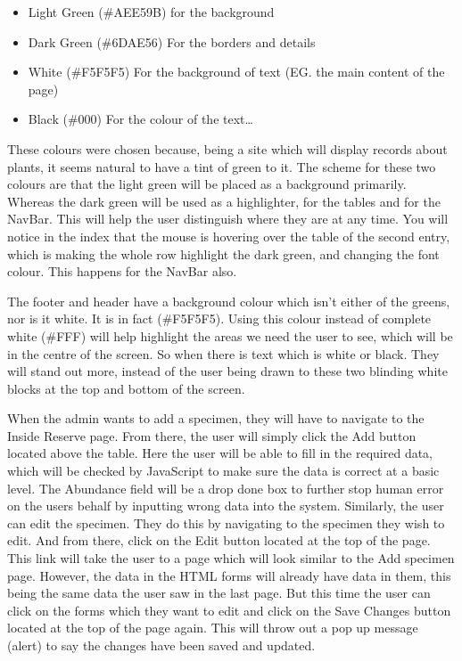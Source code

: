 \documentclass[12pt]{article}
\begin{document}
\begin{itemize}
  \item Light Green \textcolor{lgreen}{(\#AEE59B)} for the background
  \item Dark Green \textcolor{dgreen}{(\#6DAE56)} For the borders and details
  \item White (\#F5F5F5) For the background of text (EG. the main content of the page)
  \item Black (\#000) For the colour of the text\ldots
\end{itemize}

These colours were chosen because, being a site which will display records about plants, it seems natural to have a tint of green to it. The scheme for these two colours are that the light green will be placed as a background primarily. Whereas the dark green will be used as a highlighter, for the tables and for the NavBar. This will help the user distinguish where they are at any time. You will notice in the index that the mouse is hovering over the table of the second entry, which is making the whole row highlight the dark green, and changing the font colour. This happens for the NavBar also.

The footer and header have a background colour which isn't either of the greens, nor is it white. It is in fact (\#F5F5F5). Using this colour instead of complete white (\#FFF) will help highlight the areas we need the user to see, which will be in the centre of the screen. So when there is text which is white or black. They will stand out more, instead of the user being drawn to these two blinding white blocks at the top and bottom of the screen.

When the admin wants to add a specimen, they will have to navigate to the Inside Reserve page. From there, the user will simply click the Add button located above the table. Here the user will be able to fill in the required data, which will be checked by JavaScript to make sure the data is correct at a basic level. The Abundance field will be a drop done box to further stop human error on the users behalf by inputting wrong data into the system. Similarly, the user can edit the specimen. They do this by navigating to the specimen they wish to edit. And from there, click on the Edit button located at the top of the page. This link will take the user to a page which will look similar to the Add specimen page. However, the data in the HTML forms will already have data in them, this being the same data the user saw in the last page. But this time the user can click on the forms which they want to edit and click on the Save Changes button located at the top of the page again. This will throw out a pop up message (alert) to say the changes have been saved and updated.
\end{document}
